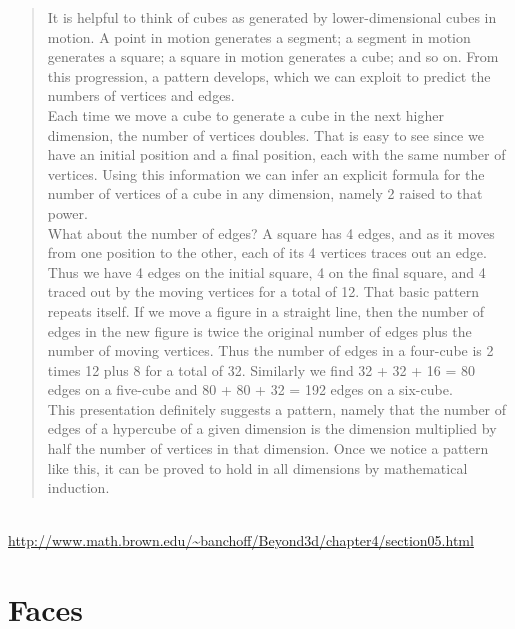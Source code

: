 \documentclass[12pt]{article}
\begin{document}
	\begin{quote}		
	It is helpful to think of cubes as generated by lower-dimensional cubes in motion. A point in motion generates a segment; a segment in motion generates a square; a square in motion generates a cube; and so on. From this progression, a pattern develops, which we can exploit to predict the numbers of vertices and edges.\\
	Each time we move a cube to generate a cube in the next higher dimension, the number of vertices doubles. That is easy to see since we have an initial position and a final position, each with the same number of vertices. Using this information we can infer an explicit formula for the number of vertices of a cube in any dimension, namely 2 raised to that power.\\
	What about the number of edges? A square has 4 edges, and as it moves from one position to the other, each of its 4 vertices traces out an edge. Thus we have 4 edges on the initial square, 4 on the final square, and 4 traced out by the moving vertices for a total of 12. That basic pattern repeats itself. If we move a figure in a straight line, then the number of edges in the new figure is twice the original number of edges plus the number of moving vertices. Thus the number of edges in a four-cube is 2 times 12 plus 8 for a total of 32. Similarly we find 32 + 32 + 16 = 80 edges on a five-cube and 80 + 80 + 32 = 192 edges on a six-cube.\\
	This presentation definitely suggests a pattern, namely that the number of edges of a hypercube of a given dimension is the dimension multiplied by half the number of vertices in that dimension. Once we notice a pattern like this, it can be proved to hold in all dimensions by mathematical induction.
	\end{quote}
	\\
	\url{http://www.math.brown.edu/~banchoff/Beyond3d/chapter4/section05.html}
	\\
	\section{Faces}
\end{document}
